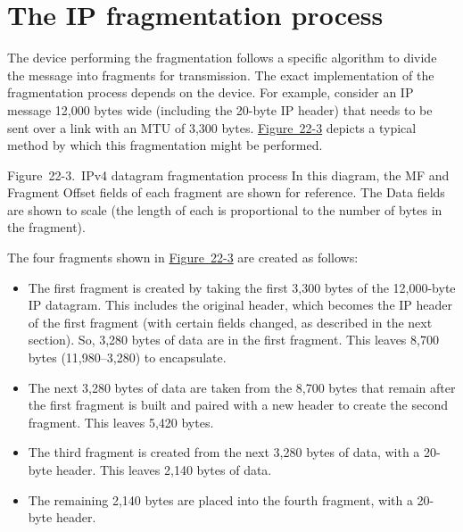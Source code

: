 \section{The IP fragmentation process}
\label{sec:ip-fragmentation-process}

\protect\hypertarget{ch22s02.htmlux5cux23idx-CHP-22-0808}{}{}The device
performing the fragmentation follows a specific algorithm to divide the
message into fragments for transmission. The exact implementation of the
fragmentation process depends on the device. For example, consider an IP
message 12,000 bytes wide (including the 20-byte IP header) that needs
to be sent over a link with an MTU of 3,300 bytes.
\protect\hyperlink{ch22s02.htmlux5cux23ipv4_datagram_fragmentation_process_in_t}{Figure~22-3}
depicts a typical method by which this fragmentation might be performed.

\protect\hypertarget{ch22s02.htmlux5cux23ipv4_datagram_fragmentation_process_in_t}{}{}

\protect\hypertarget{ch22s02.htmlux5cux23I_mediaobject8_d1e23900}{}{}

Figure~22-3.~IPv4 datagram fragmentation process In this diagram, the MF
and Fragment Offset fields of each fragment are shown for reference. The
Data fields are shown to scale (the length of each is proportional to
the number of bytes in the fragment).

The four fragments shown in
\protect\hyperlink{ch22s02.htmlux5cux23ipv4_datagram_fragmentation_process_in_t}{Figure~22-3}
are created as follows:

\begin{itemize}
\item
  The first fragment is created by taking the first 3,300 bytes of the
  12,000-byte IP datagram. This includes the original header, which
  becomes the IP header of the first fragment (with certain fields
  changed, as described in the next section). So, 3,280 bytes of data
  are in the first fragment. This leaves 8,700 bytes (11,980--3,280) to
  encapsulate.
\item
  The next 3,280 bytes of data are taken from the 8,700 bytes that
  remain after the first fragment is built and paired with a new header
  to create the second fragment. This leaves 5,420 bytes.
\item
  The third fragment is created from the next 3,280 bytes of data, with
  a 20-byte header. This leaves 2,140 bytes of data.
\item
  The remaining 2,140 bytes are placed into the fourth fragment, with a
  20-byte header.
\end{itemize}

